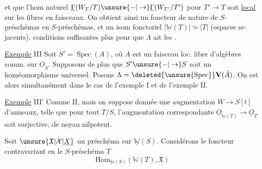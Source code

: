  et que l'hom naturel $\underline\Gamma(W_T/T)\unsure{-|\to}\underline\Gamma(W_{T'}/T')$ pour $T'\to T$  soit \uline{local} sur les fibres en faisceaux. On obtient ainsi un foncteur  de nature  de $S$-préschémas en $S$-préschémas, et un isom fonctoriel $|\underline{\mathbb W}(T)|\simeq|T|$ (espaces ss-jacents).   conditions suffisantes plus  pour que $\Lambda$ ait les .

\uline{Exemple} III Soit $S'=\operatorname{Spec}(A)$, où $A$ est un faisceau loc. libre d'algèbres comm. sur $\underline O_S$. Supposons de plus que $S'\unsure{-|\to}S$ soit un homéomorphisme universel. Posons $\Lambda=\deleted{\unsure{\operatorname{Spec}}}\mathbf V(\check A)$. On est alors simultanément dans le cas de l'exemple I et de l'exemple II.

\uline{Exemple} III' Comme II, mais on suppose donnée une augmentation $W\longrightarrow S[t]$ d'anneaux, telle que pour tout $T/S$, l'augmentation correspondante $\underline O_{\underline{\mathbb W}(T)}\longrightarrow\underline O_T$ soit surjective, de noyau nilpotent.

Soit $\unsure{\mathfrak X|\mathcal X|\underline X}$ un préschéma sur $\underline{\mathbb W}(S)$. Considérons le foncteur contravariant en le $S$-préschéma $T$
\[
\mathrm{Hom}_{\mathbb W(S)}(\mathbb W(T),\mathfrak X)\tag*{(*)}
\]

